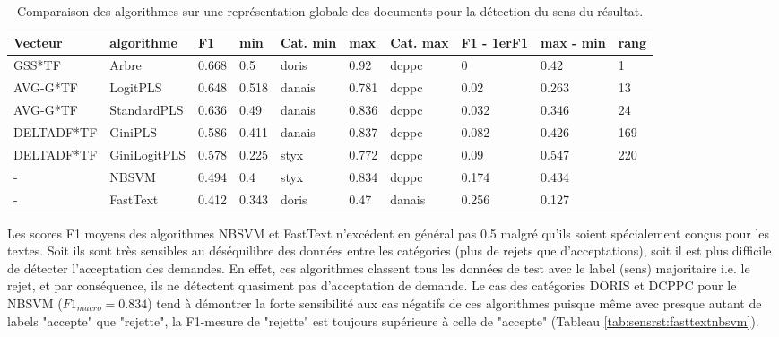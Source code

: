 \begin{table}[!htb]
	\begin{tabular}{|l|l|l|l|l|l|l|l|l|l|}
		\hline
		\textbf{Vecteur} & \textbf{algorithme} & \textbf{F1} & \textbf{min} & \textbf{Cat. min} & \textbf{max} & \textbf{Cat. max} & \textbf{F1 - 1erF1} & \textbf{max - min} & \textbf{rang} \\ \hline
		GSS*TF           & Arbre               & 0.668       & 0.5          & doris             & 0.92         & dcppc             & 0                   & 0.42               & 1             \\ \hline
		AVG-G*TF         & LogitPLS            & 0.648       & 0.518        & danais            & 0.781        & dcppc             & 0.02                & 0.263              & 13            \\ \hline
		AVG-G*TF         & StandardPLS         & 0.636       & 0.49         & danais            & 0.836        & dcppc             & 0.032               & 0.346              & 24            \\ \hline
		DELTADF*TF       & GiniPLS             & 0.586       & 0.411        & danais            & 0.837        & dcppc             & 0.082               & 0.426              & 169           \\ \hline
		DELTADF*TF       & GiniLogitPLS        & 0.578       & 0.225        & styx              & 0.772        & dcppc             & 0.09                & 0.547              & 220           \\ \hline
		-                & NBSVM               & 0.494       & 0.4          & styx              & 0.834        & dcppc             & 0.174               & 0.434              &               \\ \hline
		-                & FastText            & 0.412       & 0.343        & doris             & 0.47         & danais            & 0.256               & 0.127              &               \\ \hline
	\end{tabular}
\caption{Comparaison des algorithmes sur une représentation globale des documents pour la détection du sens du résultat.}\label{tab:sensrst:global}
\end{table}

 Les scores F1 moyens des algorithmes  NBSVM et FastText n'excédent en général pas 0.5 malgré qu'ils soient spécialement conçus pour les textes.  Soit ils sont très sensibles au déséquilibre des données entre les catégories (plus de rejets que d'acceptations), soit il est plus difficile de détecter l'acceptation des demandes. En effet, ces algorithmes classent tous les données de test avec le label (sens) majoritaire i.e. le rejet, et par conséquence, ils ne détectent quasiment pas d'acceptation de demande. Le cas des catégories DORIS et DCPPC pour le NBSVM ($F1_{macro} = 0.834$) tend à démontrer la forte sensibilité aux cas négatifs de ces algorithmes puisque même avec presque autant de labels "accepte" que "rejette", la F1-mesure de "rejette" est toujours supérieure à celle de "accepte" (Tableau \ref{tab:sensrst:fasttextnbsvm}). 
 
